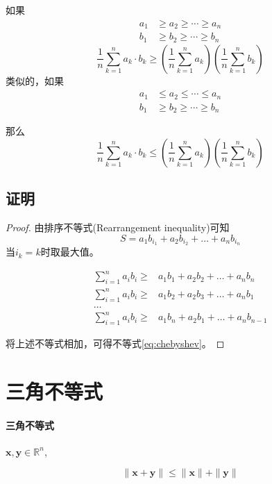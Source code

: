 \documentclass[a4paper]{article} %
\numberwithin{equation}{section} %
\begin{document}
如果
\begin{align}
a_1&\ge a_2\ge\cdots\ge a_n \\
b_1&\ge b_2\ge\cdots\ge b_n
\end{align}
\begin{equation}
\frac{1}{n}\sum_{k=1}^na_k\cdot b_k\ge\left(\frac{1}{n}\sum_{k=1}^na_k\right)\left(\frac{1}{n}\sum_{k=1}^nb_k\right) \label{eq:chebyshev}
\end{equation}
类似的，如果
\begin{align}
a_1&\le a_2\le\cdots\le a_n \\
b_1&\ge b_2\ge\cdots\ge b_n
\end{align}

那么
\begin{equation}
\frac{1}{n}\sum_{k=1}^na_k\cdot b_k\le \left(\frac{1}{n}\sum_{k=1}^na_k\right)\left(\frac{1}{n}\sum_{k=1}^nb_k\right)
\end{equation}

\subsection{证明}
\begin{proof}
由排序不等式(Rearrangement inequality)可知
$$S=a_1b_{i_1}+a_2b_{i_2}+\ldots+a_nb_{i_n}
$$当$i_k=k$时取最大值。

\begin{align}
\sum_{i=1}^na_ib_i\ge& a_1b_1+a_2b_2+\ldots+a_nb_n \\
\sum_{i=1}^na_ib_i\ge& a_1b_2+a_2b_3+\ldots+a_nb_1 \\
\ldots& \\
\sum_{i=1}^n a_ib_i\ge& a_1b_n+a_2b_1+\ldots+a_nb_{n-1}
\end{align}

将上述不等式相加，可得不等式\eqref{eq:chebyshev}。
\end{proof}


\section{三角不等式}

\paragraph{三角不等式}
$\mathbf{x},\mathbf{y}\in \mathbb R^n$,

\begin{equation}
\|\mathbf{x}+\mathbf{y}\|\le\|\mathbf{x}\|+\|\mathbf{y}\|
\end{equation}
\end{document}
